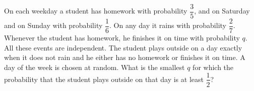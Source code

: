 On each weekday a student has homework with probability $\dfrac35$, and on Saturday and on Sunday with probability $\dfrac16$. On any day it rains with probability $\dfrac27$. Whenever the student has homework, he finishes it on time with probability $q$. All these events are independent. The student plays outside on a day exactly when it does not rain and he either has no homework or finishes it on time. A day of the week is chosen at random. What is the smallest $q$ for which the probability that the student plays outside on that day is at least $\dfrac12$?
